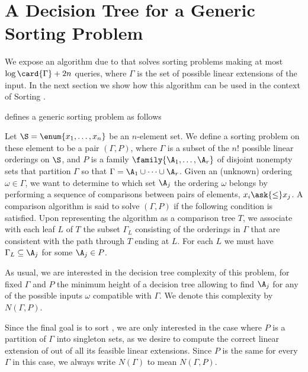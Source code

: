 \section{A Decision Tree for a Generic Sorting Problem}
\label{tree:xy:dt}

We expose an algorithm due to \citet*{fredman:1976}
that solves sorting problems making at most $\log\card{\Gamma} + 2n$ queries,
where $\Gamma$ is the set of possible linear extensions of the input. In the
next section we show how this algorithm can be used in the context of
Sorting \XY.

\citet{fredman:1976} defines a generic sorting problem as follows
\begin{problem}
Let $\S = \enum{x_1, \ldots, x_n}$ be an $n$-element set. We define a sorting
problem on these element to be a pair $(\Gamma, P)$, where $\Gamma$ is a
subset of the $n!$ possible linear orderings on $\S$, and
$P$ is a family $\family{\A_1, \ldots, \A_r}$ of disjoint nonempty sets that
partition $\Gamma$ so that $\Gamma = \A_1 \cup \cdots \cup \A_r$. Given an
(unknown) ordering $\omega \in \Gamma$, we want to determine to which set $\A_j$ the
ordering $\omega$ belongs by performing a sequence of comparisons between
pairs of elements, $x_i \ask{\le} x_j$. A comparison algorithm is said to
solve $(\Gamma, P)$ if the following condition is satisfied. Upon representing
the algorithm as a comparison tree $T$, we associate with each leaf $L$ of $T$
the subset $\Gamma_L$ consisting of the orderings in $\Gamma$ that are
consistent with the
path through $T$ ending at $L$. For each $L$ we must have $\Gamma_L \subseteq
\A_j$ for some $\A_j \in P$.
\end{problem}

As usual, we are interested in the decision tree complexity of this
problem, \ie for fixed \(\Gamma\) and \(P\) the minimum height of a decision
tree allowing to find \(\A_j\) for any of the possible inputs \(\omega\) compatible
with \(\Gamma\). We denote this complexity by $N(\Gamma, P)$.

Since the final goal is to sort \XY, we are only interested in the case
where $P$ is a partition of $\Gamma$ into singleton sets, as we desire to
compute the correct linear extension of \XY out of all its feasible linear
extensions. Since $P$ is the same for every $\Gamma$ in this case, we
always write $N(\Gamma)$ to mean $N(\Gamma, P)$.

